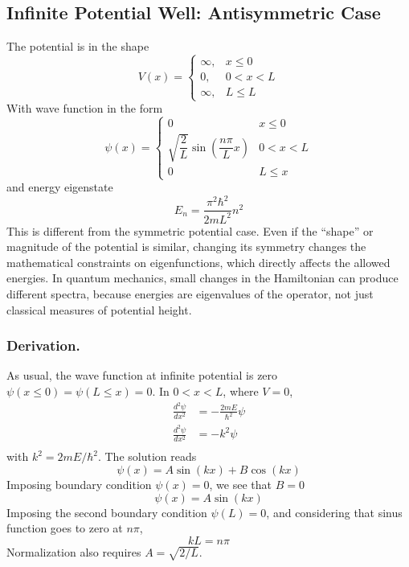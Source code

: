\documentclass[../../../main.tex]{subfiles}
\begin{document}
\subsection{Infinite Potential Well: Antisymmetric Case}
The potential is in the shape
\begin{equation*}
    V(x)=
    \begin{cases}
        \infty, & x \leq0  \\
        0,      & 0<x<L    \\
        \infty, & L \leq L
    \end{cases}
\end{equation*}
With wave function in the form
\begin{equation*}
    \psi(x)=\begin{cases}
        0                                          & x\leq 0   \\
        \sqrt{\dfrac{2}{L}}\sin( \dfrac{n\pi}{L}x) & 0 < x < L \\
        0                                          & L \leq x
    \end{cases}
\end{equation*}
and energy eigenstate
\begin{equation*}
    E_n=\frac{\pi^2\hbar^2}{2mL^2}n^2
\end{equation*}
This is different from the symmetric potential case.
Even if the “shape” or magnitude of the potential is similar, changing its symmetry changes the mathematical constraints on eigenfunctions, which directly affects the allowed energies.
In quantum mechanics, small changes in the Hamiltonian can produce different spectra, because energies are eigenvalues of the operator, not just classical measures of potential height.

\subsubsection{Derivation.}
As usual, the wave function at infinite potential is zero $\psi(x \leq 0)=\psi(L\leq x)=0$.
In $0 < x < L$, where $ V = 0$,
\begin{align*}
    \frac{d^2\psi}{dx^2} & = -\frac{2mE}{\hbar^2}\psi \\
    \frac{d^2\psi}{dx^2} & = -k^2\psi                 \\
\end{align*}
with $k^2 =2 m E/\hbar^2$.
The solution reads
\begin{equation*}
    \psi(x)=A\sin (kx)+ B \cos (kx)
\end{equation*}
Imposing boundary condition $\psi(x)=0$, we see that $B=0$
\begin{equation*}
    \psi(x)=A\sin (kx)
\end{equation*}
Imposing the second boundary condition $\psi(L)=0$, and considering that sinus function goes to zero at $n\pi$,
\begin{equation*}
    kL=n\pi
\end{equation*}
Normalization also requires $A = \sqrt{2/L}$.
\end{document}
